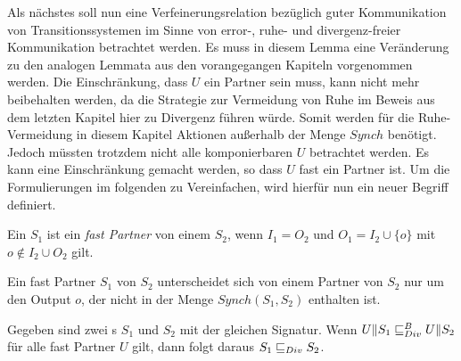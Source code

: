 Als nächstes soll nun eine Verfeinerungsrelation bezüglich guter Kommunikation
von Transitionssystemen im Sinne von error-, ruhe- und divergenz-freier
Kommunikation betrachtet werden. Es muss in diesem Lemma eine Veränderung zu
den analogen Lemmata aus den vorangegangen Kapiteln vorgenommen werden. Die
Einschränkung, dass $U$ ein Partner sein muss, kann nicht mehr beibehalten
werden, da die Strategie zur Vermeidung von Ruhe im Beweis aus dem letzten
Kapitel hier zu Divergenz führen würde. Somit werden für die Ruhe-Vermeidung in
diesem Kapitel Aktionen außerhalb der Menge $Synch$
benötigt. Jedoch müssten trotzdem nicht alle komponierbaren $U$ betrachtet
werden. Es kann eine Einschränkung gemacht werden, so dass $U$ fast ein
Partner ist. Um die Formulierungen im folgenden zu Vereinfachen, wird hierfür
nun ein neuer Begriff definiert.

\begin{Def}
  Ein \EIO{} $S_1$ ist ein \emph{fast Partner} von einem \EIO{} $S_2$, wenn
  $I_1=O_2$ und $O_1=I_2\cup\{o\}$ mit $o\notin I_2\cup O_2$ gilt.
\end{Def}

Ein fast Partner $S_1$ von $S_2$ unterscheidet sich von einem Partner von $S_2$
nur um den Output $o$, der nicht in der Menge $Synch(S_1,S_2)$ enthalten ist.

\begin{lem}
\label{lemDivVerfeinerung}
  Gegeben sind zwei \EIO{}s $S_1$ und $S_2$ mit der gleichen Signatur. Wenn
  $U\|S_1\sqsubseteq _{Div}^B{} U\|S_2$ für alle fast Partner $U$ gilt, dann folgt daraus
  $S_1\sqsubseteq _{Div}{} S_2$.
\end{lem}

